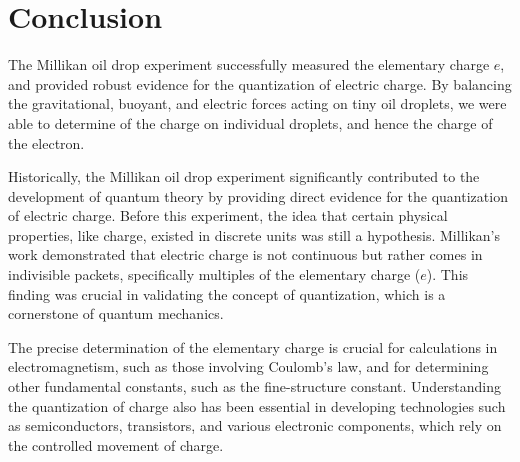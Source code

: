 \section{Conclusion}
The Millikan oil drop experiment successfully measured
the elementary charge $e$, and provided robust evidence
for the quantization of electric charge. By
balancing the gravitational, buoyant, and electric forces
acting on tiny oil droplets, we were able to determine of the charge on individual droplets, and hence the charge of the electron.

Historically, the Millikan oil drop experiment significantly contributed to the development of quantum theory by providing direct evidence for the quantization of electric
charge.
Before this experiment, the idea that certain
physical properties, like charge, existed in discrete units
was still a hypothesis. Millikan’s work demonstrated that
electric charge is not continuous but rather comes in indivisible packets, specifically multiples of the elementary
charge ($e$). This finding was crucial in validating the concept of quantization, which is a cornerstone of quantum
mechanics.

The precise determination of the elementary charge is crucial for calculations in electromagnetism,
such as those involving Coulomb’s law, and for determining other fundamental constants, such as the
fine-structure constant. Understanding the quantization of charge also has been
essential in developing technologies such as semiconductors, transistors, and various electronic components, which rely on the controlled movement of
charge.